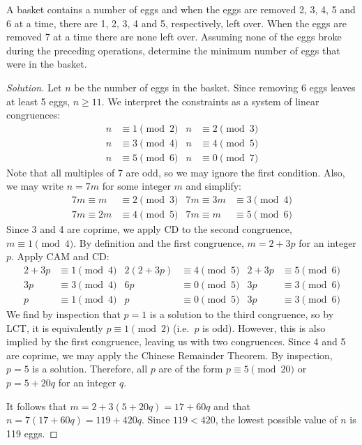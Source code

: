 \question A basket contains a number of eggs and when the eggs
are removed 2, 3, 4, 5 and 6 at a time, there are 1, 2, 3, 4 and 5, respectively, left over.
When the eggs are removed 7 at a time there are none left over.
Assuming none of the eggs broke during the preceding operations,
determine the minimum number of eggs that were in the basket.
\begin{proof}[Solution]
  Let $n$ be the number of eggs in the basket.
  Since removing 6 eggs leaves at least 5 eggs, $n \geq 11$.
  We interpret the constraints as a system of linear congruences:
  \begin{align*}
    n & \equiv 1 \pmod{2} & n & \equiv 2 \pmod{3} \\
    n & \equiv 3 \pmod{4} & n & \equiv 4 \pmod{5} \\
    n & \equiv 5 \pmod{6} & n & \equiv 0 \pmod{7}
  \end{align*}
  Note that all multiples of 7 are odd, so we may ignore the first condition.
  Also, we may write $n = 7m$ for some integer $m$ and simplify:
  \begin{align*}
    7m \equiv m  & \equiv 2 \pmod{3} & 7m \equiv 3m & \equiv 3 \pmod{4} \\
    7m \equiv 2m & \equiv 4 \pmod{5} & 7m \equiv m  & \equiv 5 \pmod{6}
  \end{align*}
  Since 3 and 4 are coprime, we apply CD to the second congruence, $m \equiv 1 \pmod{4}$.
  By definition and the first congruence, $m = 2 + 3p$ for an integer $p$.
  Apply CAM and CD\@:
  \begin{align*}
    2+3p & \equiv 1 \pmod{4} & 2(2+3p) & \equiv 4 \pmod{5} & 2+3p & \equiv 5 \pmod{6} \\
    3p   & \equiv 3 \pmod{4} & 6p      & \equiv 0 \pmod{5} & 3p   & \equiv 3 \pmod{6} \\
    p    & \equiv 1 \pmod{4} & p       & \equiv 0 \pmod{5} & 3p   & \equiv 3 \pmod{6}
  \end{align*}
  We find by inspection that $p=1$ is a solution to the third congruence, so by LCT,
  it is equivalently $p \equiv 1 \pmod{2}$ (i.e.\ $p$ is odd).
  However, this is also implied by the first congruence, leaving us with two congruences.
  Since 4 and 5 are coprime, we may apply the Chinese Remainder Theorem.
  By inspection, $p=5$ is a solution.
  Therefore, all $p$ are of the form $p \equiv 5 \pmod{20}$ or $p = 5 + 20q$ for an integer $q$.

  It follows that $m = 2+3(5+20q) = 17 + 60q$ and that $n = 7(17+60q) = 119 + 420q$.
  Since $119 < 420$, the lowest possible value of $n$ is 119 eggs.
\end{proof}


